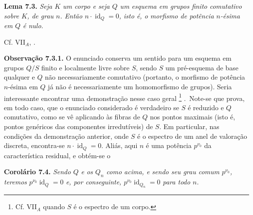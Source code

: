 \medskip
\noindent{}\textbf{Lema 7.3.}
\textit{Seja \(K\) um corpo e seja \(Q\) um esquema em grupos finito
comutativo sobre \(K\), de grau \(n\). Então \(n\cdot\operatorname{id}_Q=0\),
isto é, o morfismo de potência \(n\)-ésima em \(Q\) é nulo.}

Cf. VII\(_A\), .

\medskip
\noindent{}\textbf{Observação 7.3.1.}
O enunciado  conserva um sentido
para um esquema em grupos \(Q/S\) finito e localmente livre sobre \(S\),
sendo \(S\) um pré-esquema de base qualquer e \(Q\) não necessariamente
comutativo (portanto, o morfismo de potência \(n\)-ésima em \(Q\) já não
é necessariamente um homomorfismo de grupos). Seria interessante encontrar
uma demonstração nesse caso geral\begingroup
\renewcommand{\thefootnote}{(\(\ast\))}%
\footnote[0]{Cf. VII\(_A\)  quando
\(S\) é o espectro de um corpo.}%
\endgroup.\ Note-se que  prova, em todo caso,
que o enunciado considerado é verdadeiro se \(S\) é reduzido e \(Q\)
comutativo, como se vê aplicando 
às fibras de \(Q\) nos pontos maximais (isto é, pontos genéricos das
componentes irredutíveis) de \(S\). Em particular, nas condições da
demonstração anterior, onde \(S\) é o espectro de um anel de valoração
discreta, encontra-se \(n\cdot\operatorname{id}_Q=0\). Aliás, aqui
\(n\) é uma potência \(p^{\nu_0}\) da característica residual, e obtém-se o

\medskip
\noindent{}\textbf{Corolário 7.4.}
\textit{Sendo \(Q\) e os \(Q_n\) como acima, e sendo seu grau comum
\(p^{\nu_0}\), teremos \(p^{\nu_0}\operatorname{id}_Q=0\) e, por
conseguinte, \(p^{\nu_0}\operatorname{id}_{Q_n}=0\) para todo \(n\).}
